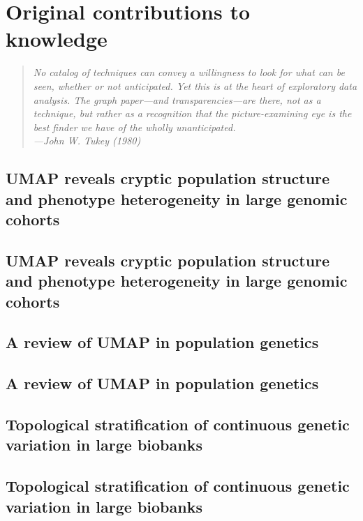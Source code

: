 \documentclass[12pt, TexShade, letterpaper]{report}
\makeatletter
\newcommand{\unchapter}[1]{%
  \begingroup
  \let\@makechapterhead\@gobble %
  \chapter{#1}
  \endgroup
}
\makeatother
\begin{document}
%
%

\part{Original contributions to knowledge}
\label{part:manuscripts}

\pagebreak
\hspace{0pt}
\vfill

\begin{center}
\begin{quote} 
\begin{singlespace}
\textit{No catalog of techniques can convey a willingness to look for what can be seen, whether or not anticipated. Yet this is at the heart of exploratory data analysis. The graph paper---and transparencies---are there, not as a technique, but rather as a recognition that the picture-examining eye is the best finder we have of the wholly unanticipated. \\
---John W. Tukey (1980)}
\end{singlespace}
\end{quote}
\end{center}

\vfill
\hspace{0pt}
\pagebreak


\begin{refsection}
\unchapter{UMAP reveals cryptic population structure and phenotype heterogeneity in large genomic cohorts}
\chapter*{UMAP reveals cryptic population structure and phenotype heterogeneity in large genomic cohorts}
\label{chap:chapter1}

\printbibliography[heading=subbibintoc]
\end{refsection}

\begin{refsection}
\unchapter{A review of UMAP in population genetics}
\chapter*{A review of UMAP in population genetics}
\label{chap:chapter2}

\printbibliography[heading=subbibintoc]
\end{refsection}

\begin{refsection}
\unchapter{Topological stratification of continuous genetic variation in large biobanks}
\chapter*{Topological stratification of continuous genetic variation in large biobanks}
\label{chap:chapter3}

\printbibliography[heading=subbibintoc]
\end{refsection}
\end{document}
